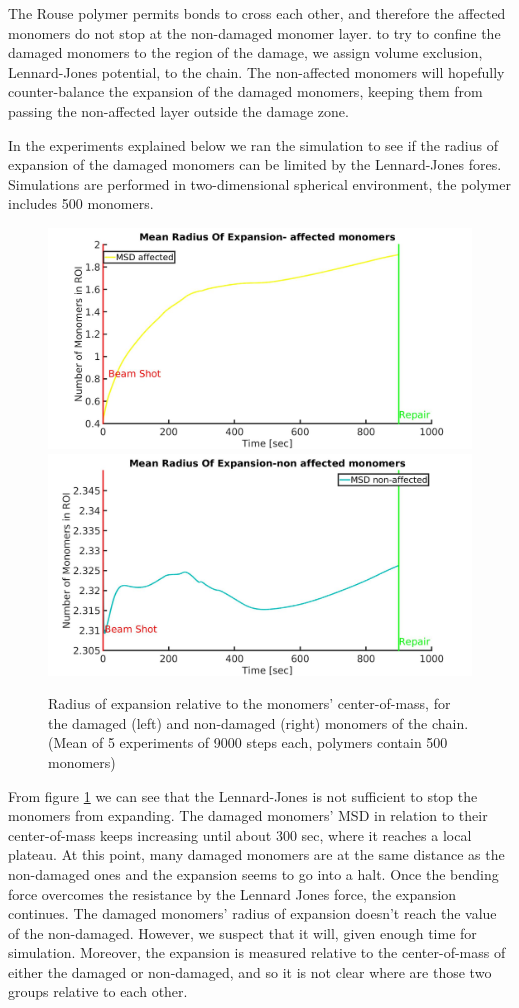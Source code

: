 \documentclass[12pt]{report}
\begin{document}
      The Rouse polymer permits bonds to cross each other, and therefore the affected monomers do not stop at the non-damaged monomer layer. 
      to try to confine the damaged monomers to the region of the damage, we assign volume exclusion, Lennard-Jones potential, to the chain. The non-affected monomers will hopefully counter-balance the expansion of the damaged monomers, keeping them from passing the non-affected layer outside the damage zone.
      
      In the experiments explained below we ran the simulation to see if the radius of expansion of the damaged monomers can be limited by the Lennard-Jones fores. Simulations are performed in two-dimensional spherical environment, the polymer includes 500 monomers.      
      
     \begin{figure}[H]
     \includegraphics[width=0.5\linewidth, height=0.3\textheight]{RadiusOfExpansion500BeadsLennardJones}
    	\includegraphics[width=0.5\linewidth, height=0.3\textheight]{RadiusOfExpansion500BeadsNonAffectedLennardJones}
        \caption{Radius of expansion relative to the monomers' center-of-mass, for the damaged (left) and non-damaged (right) monomers of the chain.(Mean of 5 experiments of 9000 steps each, polymers contain 500 monomers)}
        \label{fig:RadiusOfExpansion500BeadsLennardJones}
      \end{figure}
      
      From figure \ref{fig:RadiusOfExpansion500BeadsLennardJones} we can see that the Lennard-Jones is not sufficient to stop the monomers from expanding. The damaged monomers' MSD in relation to their center-of-mass keeps increasing until about 300 sec, where it reaches a local plateau. At this point, many damaged monomers are at the same distance as the non-damaged ones and the expansion seems to go into a halt. Once the bending force overcomes the resistance by the Lennard Jones force, the expansion continues. The damaged monomers' radius of expansion doesn't reach the value of the non-damaged. However, we suspect that it will, given enough time for simulation. Moreover, the expansion is measured relative to the center-of-mass of either the damaged or non-damaged, and so it is not clear where are those two groups relative to each other. 
      
\end{document}
